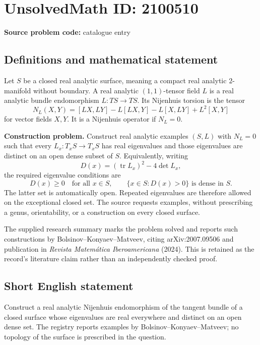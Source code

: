 \documentclass[11pt]{article}
\begin{document}
\section*{UnsolvedMath ID: 2100510}
\textbf{Source problem code:} catalogue entry
\subsection{Definitions and mathematical statement}
Let $S$ be a closed real analytic surface, meaning a compact real analytic $2$-manifold without boundary. A real analytic $(1,1)$-tensor field $L$ is a real analytic bundle endomorphism $L:TS\to TS$. Its Nijenhuis torsion is the tensor
\[
 N_L(X,Y)=[LX,LY]-L[LX,Y]-L[X,LY]+L^2[X,Y]
\]
for vector fields $X,Y$. It is a Nijenhuis operator if $N_L=0$.

\textbf{Construction problem.} Construct real analytic examples $(S,L)$ with $N_L=0$ such that every $L_x:T_xS\to T_xS$ has real eigenvalues and those eigenvalues are distinct on an open dense subset of $S$. Equivalently, writing
\[
 D(x)=(\operatorname{tr}L_x)^2-4\det L_x,
\]
the required eigenvalue conditions are
\[
 D(x)\geq0\quad\text{for all }x\in S,
 \qquad \{x\in S:D(x)>0\}\text{ is dense in }S.
\]
The latter set is automatically open. Repeated eigenvalues are therefore allowed on the exceptional closed set. The source requests examples, without prescribing a genus, orientability, or a construction on every closed surface.

The supplied research summary marks the problem solved and reports such constructions by Bolsinov--Konyaev--Matveev, citing arXiv:2007.09506 and publication in \emph{Revista Matem\'atica Iberoamericana} (2024). This is retained as the record's literature claim rather than an independently checked proof.
\subsection{Short English statement}
Construct a real analytic Nijenhuis endomorphism of the tangent bundle of a closed surface whose eigenvalues are real everywhere and distinct on an open dense set. The registry reports examples by Bolsinov--Konyaev--Matveev; no topology of the surface is prescribed in the question.
\end{document}
